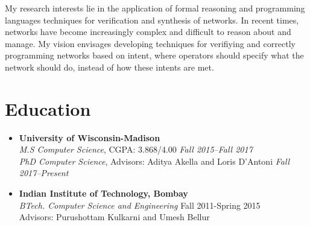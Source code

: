 \documentclass[11pt,a4paper,sans]{moderncv}        %
\begin{document}
\makecvtitle

\small{My research interests lie in the application of formal reasoning and programming languages techniques for verification and synthesis of networks. In recent times, networks have become increasingly complex and difficult to reason about and manage. My vision envisages developing techniques for verifiying and correctly programming networks based on intent, where operators should specify what the network should do, instead of how these intents are met.}

\section{Education}

\vspace{5pt}

\begin{itemize}

\item \textbf{University of Wisconsin-Madison} \\
\emph{M.S Computer Science}, CGPA: 3.868/4.00  \hfill \emph{Fall 2015--Fall 2017} \\
\emph{PhD Computer Science}, Advisors: Aditya Akella and Loris D'Antoni   \hfill \emph{Fall 2017--Present} \\

\item \textbf{Indian Institute of Technology, Bombay} \\
\emph{BTech. Computer Science and Engineering} \hfill Fall 2011-Spring 2015 \\
Advisors: Purushottam Kulkarni and Umesh Bellur

\end{itemize}
\end{document}
